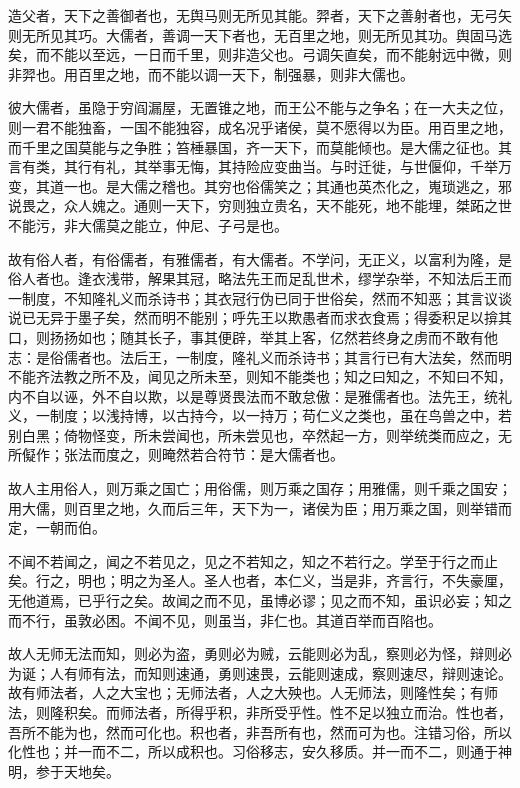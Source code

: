 \documentclass[]{article}
\begin{document}
造父者，天下之善御者也，无舆马则无所见其能。羿者，天下之善射者也，无弓矢则无所见其巧。大儒者，善调一天下者也，无百里之地，则无所见其功。舆固马选矣，而不能以至远，一日而千里，则非造父也。弓调矢直矣，而不能射远中微，则非羿也。用百里之地，而不能以调一天下，制强暴，则非大儒也。

彼大儒者，虽隐于穷阎漏屋，无置锥之地，而王公不能与之争名；在一大夫之位，则一君不能独畜，一国不能独容，成名况乎诸侯，莫不愿得以为臣。用百里之地，而千里之国莫能与之争胜；笞棰暴国，齐一天下，而莫能倾也。是大儒之征也。其言有类，其行有礼，其举事无悔，其持险应变曲当。与时迁徙，与世偃仰，千举万变，其道一也。是大儒之稽也。其穷也俗儒笑之；其通也英杰化之，嵬琐逃之，邪说畏之，众人媿之。通则一天下，穷则独立贵名，天不能死，地不能埋，桀跖之世不能污，非大儒莫之能立，仲尼、子弓是也。

故有俗人者，有俗儒者，有雅儒者，有大儒者。不学问，无正义，以富利为隆，是俗人者也。逢衣浅带，解果其冠，略法先王而足乱世术，缪学杂举，不知法后王而一制度，不知隆礼义而杀诗书；其衣冠行伪已同于世俗矣，然而不知恶；其言议谈说已无异于墨子矣，然而明不能别；呼先王以欺愚者而求衣食焉；得委积足以揜其口，则扬扬如也；随其长子，事其便辟，举其上客，亿然若终身之虏而不敢有他志：是俗儒者也。法后王，一制度，隆礼义而杀诗书；其言行已有大法矣，然而明不能齐法教之所不及，闻见之所未至，则知不能类也；知之曰知之，不知曰不知，内不自以诬，外不自以欺，以是尊贤畏法而不敢怠傲：是雅儒者也。法先王，统礼义，一制度；以浅持博，以古持今，以一持万；苟仁义之类也，虽在鸟兽之中，若别白黑；倚物怪变，所未尝闻也，所未尝见也，卒然起一方，则举统类而应之，无所儗作；张法而度之，则晻然若合符节：是大儒者也。

故人主用俗人，则万乘之国亡；用俗儒，则万乘之国存；用雅儒，则千乘之国安；用大儒，则百里之地，久而后三年，天下为一，诸侯为臣；用万乘之国，则举错而定，一朝而伯。

不闻不若闻之，闻之不若见之，见之不若知之，知之不若行之。学至于行之而止矣。行之，明也；明之为圣人。圣人也者，本仁义，当是非，齐言行，不失豪厘，无他道焉，已乎行之矣。故闻之而不见，虽博必谬；见之而不知，虽识必妄；知之而不行，虽敦必困。不闻不见，则虽当，非仁也。其道百举而百陷也。

故人无师无法而知，则必为盗，勇则必为贼，云能则必为乱，察则必为怪，辩则必为诞；人有师有法，而知则速通，勇则速畏，云能则速成，察则速尽，辩则速论。故有师法者，人之大宝也；无师法者，人之大殃也。人无师法，则隆性矣；有师法，则隆积矣。而师法者，所得乎积，非所受乎性。性不足以独立而治。性也者，吾所不能为也，然而可化也。积也者，非吾所有也，然而可为也。注错习俗，所以化性也；并一而不二，所以成积也。习俗移志，安久移质。并一而不二，则通于神明，参于天地矣。
\end{document}
